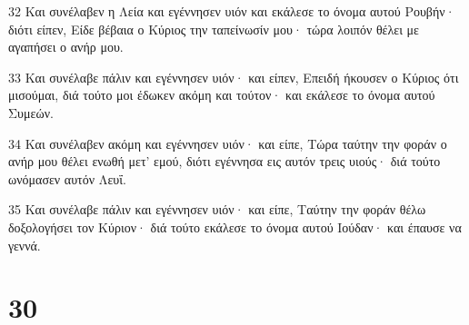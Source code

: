 \par 32 Και συνέλαβεν η Λεία και εγέννησεν υιόν και εκάλεσε το όνομα αυτού Ρουβήν· διότι είπεν, Είδε βέβαια ο Κύριος την ταπείνωσίν μου· τώρα λοιπόν θέλει με αγαπήσει ο ανήρ μου.
\par 33 Και συνέλαβε πάλιν και εγέννησεν υιόν· και είπεν, Επειδή ήκουσεν ο Κύριος ότι μισούμαι, διά τούτο μοι έδωκεν ακόμη και τούτον· και εκάλεσε το όνομα αυτού Συμεών.
\par 34 Και συνέλαβεν ακόμη και εγέννησεν υιόν· και είπε, Τώρα ταύτην την φοράν ο ανήρ μου θέλει ενωθή μετ' εμού, διότι εγέννησα εις αυτόν τρεις υιούς· διά τούτο ωνόμασεν αυτόν Λευΐ.
\par 35 Και συνέλαβε πάλιν και εγέννησεν υιόν· και είπε, Ταύτην την φοράν θέλω δοξολογήσει τον Κύριον· διά τούτο εκάλεσε το όνομα αυτού Ιούδαν· και έπαυσε να γεννά.

\chapter{30}

